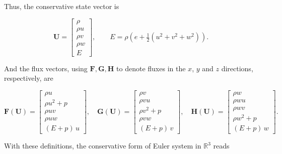 \documentclass[11pt]{article}
\begin{document}
Thus, the conservative state vector is

\[
  \mathbf{U} =
  \begin{bmatrix}
    \rho \\[2mm]
    \rho u \\[2mm]
    \rho v \\[2mm]
    \rho w \\[2mm]
    E
  \end{bmatrix},
\qquad
E = \rho\!\left(e + \tfrac12(u^{2}+v^{2}+w^{2})\right).
\]

And the flux vectors, using \(\mathbf{F},\mathbf{G},\mathbf{H}\) to denote fluxes in the
\(x\), \(y\) and \(z\) directions, respectively, are

\[
  \mathbf{F}(\mathbf{U}) =
  \begin{bmatrix}
    \rho u \\[2mm]
    \rho u^{2} + p \\[2mm]
    \rho u v \\[2mm]
    \rho u w \\[2mm]
    (E + p)\,u
  \end{bmatrix}, \quad
  \mathbf{G}(\mathbf{U}) =
  \begin{bmatrix}
    \rho v \\[2mm]
    \rho v u \\[2mm]
    \rho v^{2} + p \\[2mm]
    \rho v w \\[2mm]
    (E + p)\,v
  \end{bmatrix}, \quad
  \mathbf{H}(\mathbf{U}) =
  \begin{bmatrix}
    \rho w \\[2mm]
    \rho w u \\[2mm]
    \rho w v \\[2mm]
    \rho w^{2} + p \\[2mm]
    (E + p)\,w
  \end{bmatrix}.
\]

With these definitions, the conservative form of Euler system in $\mathbb{R}^{3}$ reads
\end{document}

